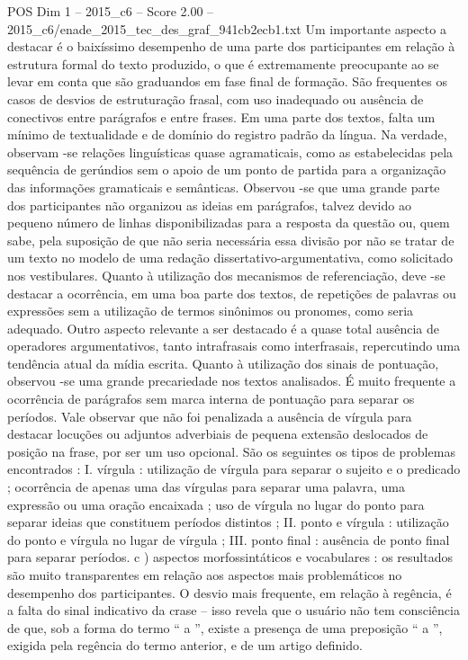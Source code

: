 \begin{textsample}{POS Dim 1 – 2015\_c6 – Score 2.00 – 2015\_c6/enade\_2015\_tec\_des\_graf\_941cb2ecb1.txt}
Um importante aspecto a destacar é o baixíssimo desempenho de uma parte dos participantes em relação à estrutura formal do texto produzido, o que é extremamente preocupante ao se levar em conta que são graduandos em fase final de formação.
São frequentes os casos de desvios de estruturação frasal, com uso inadequado ou ausência de conectivos entre parágrafos e entre frases.
Em uma parte dos textos, falta um mínimo de textualidade e de domínio do registro padrão da língua.
Na verdade, observam -se relações linguísticas quase agramaticais, como as estabelecidas pela sequência de gerúndios sem o apoio de um ponto de partida para a organização das informações gramaticais e semânticas.
Observou -se que uma grande parte dos participantes não organizou as ideias em parágrafos, talvez devido ao pequeno número de linhas disponibilizadas para a resposta da questão ou, quem sabe, pela suposição de que não seria necessária essa divisão por não se tratar de um texto no modelo de uma redação dissertativo-argumentativa, como solicitado nos vestibulares.
Quanto à utilização dos mecanismos de referenciação, deve -se destacar a ocorrência, em uma boa parte dos textos, de repetições de palavras ou expressões sem a utilização de termos sinônimos ou pronomes, como seria adequado.
Outro aspecto relevante a ser destacado é a quase total ausência de operadores argumentativos, tanto intrafrasais como interfrasais, repercutindo uma tendência atual da mídia escrita.
Quanto à utilização dos sinais de pontuação, observou -se uma grande precariedade nos textos analisados.
É muito frequente a ocorrência de parágrafos sem marca interna de pontuação para separar os períodos.
Vale observar que não foi penalizada a ausência de vírgula para destacar locuções ou adjuntos adverbiais de pequena extensão deslocados de posição na frase, por ser um uso opcional.
São os seguintes os tipos de problemas encontrados : I. vírgula : utilização de vírgula para separar o sujeito e o predicado ; ocorrência de apenas uma das vírgulas para separar uma palavra, uma expressão ou uma oração encaixada ; uso de vírgula no lugar do ponto para separar ideias que constituem períodos distintos ; II. ponto e vírgula : utilização do ponto e vírgula no lugar de vírgula ; III. ponto final : ausência de ponto final para separar períodos. c ) aspectos morfossintáticos e vocabulares : os resultados são muito transparentes em relação aos aspectos mais problemáticos no desempenho dos participantes.
O desvio mais frequente, em relação à regência, é a falta do sinal indicativo da crase – isso revela que o usuário não tem consciência de que, sob a forma do termo “ a ”, existe a presença de uma preposição “ a ”, exigida pela regência do termo anterior, e de um artigo definido.

\end{textsample}
